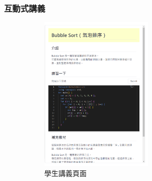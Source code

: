 


\subsubsection{互動式講義}

\begin{figure}[H]
  \begin{subfigure}{0.5\linewidth}
    \centering
    \includegraphics[width=0.6\textwidth]{images/side-s.png}
    \caption{學生講義頁面}
    \label{fig:student}
  \end{subfigure}
  \begin{subfigure}{0.5\linewidth}
    \centering

\end{subfigure}
\end{figure}

